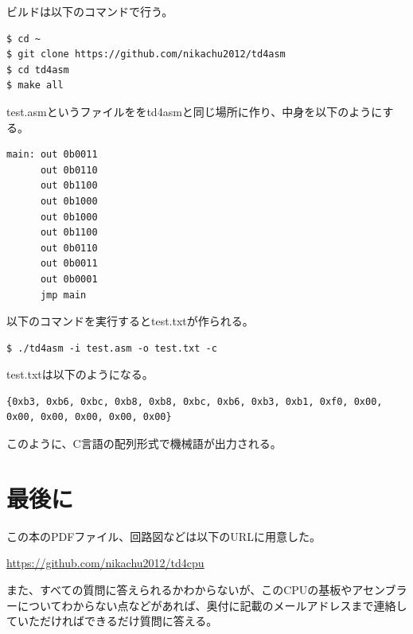 \documentclass[xelatex,a5paper,ja=standard, openany]{bxjsbook}
\begin{document}
ビルドは以下のコマンドで行う。
\begin{lstlisting}
$ cd ~
$ git clone https://github.com/nikachu2012/td4asm
$ cd td4asm
$ make all
\end{lstlisting}

test.asmというファイルををtd4asmと同じ場所に作り、中身を以下のようにする。
\begin{lstlisting}[caption=LEDちかちかさせるプログラム \texttt{test.asm}]
main: out 0b0011
      out 0b0110
      out 0b1100
      out 0b1000
      out 0b1000
      out 0b1100
      out 0b0110
      out 0b0011
      out 0b0001
      jmp main
\end{lstlisting}

以下のコマンドを実行するとtest.txtが作られる。
\begin{lstlisting}
$ ./td4asm -i test.asm -o test.txt -c
\end{lstlisting}

test.txtは以下のようになる。
\begin{lstlisting}
{0xb3, 0xb6, 0xbc, 0xb8, 0xb8, 0xbc, 0xb6, 0xb3, 0xb1, 0xf0, 0x00, 0x00, 0x00, 0x00, 0x00, 0x00}
\end{lstlisting}

このように、C言語の配列形式で機械語が出力される。

\chapter{最後に}

この本のPDFファイル、回路図などは以下のURLに用意した。

\centerline{\url{https://github.com/nikachu2012/td4cpu}}

また、すべての質問に答えられるかわからないが、このCPUの基板やアセンブラーについてわからない点などがあれば、奥付に記載のメールアドレスまで連絡していただければできるだけ質問に答える。

\newpage

\vspace*{\fill}
\end{document}
